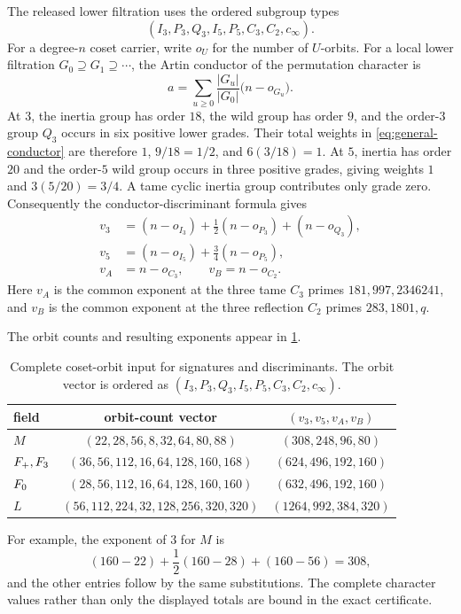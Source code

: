 The released lower filtration uses the ordered subgroup types
\[
 (I_3,P_3,Q_3,I_5,P_5,C_3,C_2,c_\infty).
\]
For a degree-$n$ coset carrier, write $o_U$ for the number of $U$-orbits.
For a local lower filtration $G_0\supseteq G_1\supseteq\cdots$, the Artin
conductor of the permutation character is
\begin{equation}
 a=\sum_{u\ge0}\frac{|G_u|}{|G_0|}\bigl(n-o_{G_u}\bigr).
 \label{eq:general-conductor}
\end{equation}
At $3$, the inertia group has order $18$, the wild group has order $9$, and
the order-$3$ group $Q_3$ occurs in six positive lower grades.  Their total
weights in \eqref{eq:general-conductor} are therefore
$1$, $9/18=1/2$, and $6(3/18)=1$.  At $5$, inertia has order $20$ and the
order-$5$ wild group occurs in three positive grades, giving weights
$1$ and $3(5/20)=3/4$.  A tame cyclic inertia group contributes only grade
zero.  Consequently the conductor-discriminant formula gives
\begin{align}
 v_3&=(n-o_{I_3})+\frac12(n-o_{P_3})+(n-o_{Q_3}),
 \label{eq:v3-formula}\\
 v_5&=(n-o_{I_5})+\frac34(n-o_{P_5}),
 \label{eq:v5-formula}\\
 v_A&=n-o_{C_3},\qquad v_B=n-o_{C_2}.
 \label{eq:vAB-formula}
\end{align}
Here $v_A$ is the common exponent at the three tame $C_3$ primes
$181,997,2346241$, and $v_B$ is the common exponent at the three reflection
$C_2$ primes $283,1801,q$.

The orbit counts and resulting exponents appear in
\cref{tab:global-orbits}.
\begin{table}[t]
\centering
\caption{Complete coset-orbit input for signatures and discriminants.  The
orbit vector is ordered as
$(I_3,P_3,Q_3,I_5,P_5,C_3,C_2,c_\infty)$.}
\label{tab:global-orbits}
\small
\begin{tabular}{@{}lcc@{}}
\toprule
field & orbit-count vector & $(v_3,v_5,v_A,v_B)$\\
\midrule
$M$ & $(22,28,56,8,32,64,80,88)$ & $(308,248,96,80)$\\
$F_{+},F_{3}$ & $(36,56,112,16,64,128,160,168)$ & $(624,496,192,160)$\\
$F_{0}$ & $(28,56,112,16,64,128,160,160)$ & $(632,496,192,160)$\\
$L$ & $(56,112,224,32,128,256,320,320)$ & $(1264,992,384,320)$\\
\bottomrule
\end{tabular}
\end{table}
For example, the exponent of $3$ for $M$ is
\[
 (160-22)+\frac12(160-28)+(160-56)=308,
\]
and the other entries follow by the same substitutions.  The complete
character values rather than only the displayed totals are bound in the
exact certificate.

